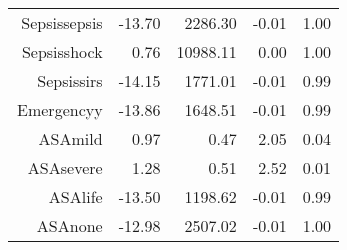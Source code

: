 \begin{tabular}{rrrrr}
$$  Sepsis\-sepsis & -13.70 & 2286.30 & -0.01 & 1.00 \\ 
  Sepsis\-shock & 0.76 & 10988.11 & 0.00 & 1.00 \\ 
  Sepsis\-sirs & -14.15 & 1771.01 & -0.01 & 0.99 \\ 
  Emergency\-y & -13.86 & 1648.51 & -0.01 & 0.99 \\ 
  ASA\-mild & 0.97 & 0.47 & 2.05 & 0.04 \\ 
  ASA\-severe & 1.28 & 0.51 & 2.52 & 0.01 \\ 
  ASA\-life & -13.50 & 1198.62 & -0.01 & 0.99 \\ 
  ASA\-none & -12.98 & 2507.02 & -0.01 & 1.00 \\ 
   \hline
\end{tabular}

